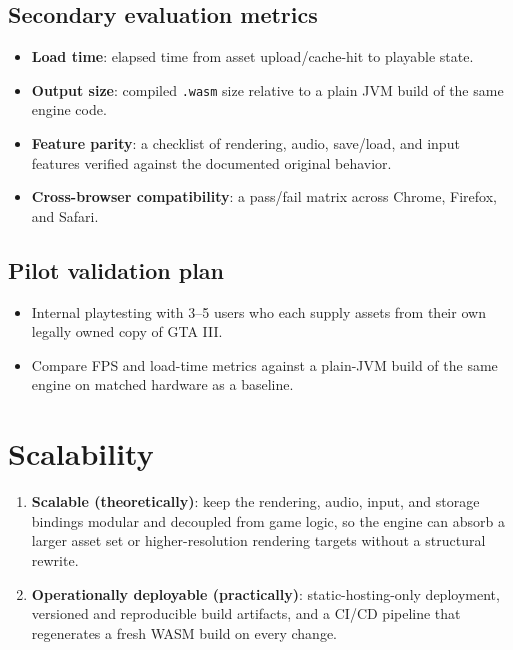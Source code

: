 \documentclass[11pt]{article}
\begin{document}
\subsection{Secondary evaluation metrics}
\begin{itemize}[itemsep=2pt]
  \item \textbf{Load time}: elapsed time from asset upload/cache-hit to playable state.
  \item \textbf{Output size}: compiled \texttt{.wasm} size relative to a plain JVM build of the same engine code.
  \item \textbf{Feature parity}: a checklist of rendering, audio, save/load, and input features verified against the documented original behavior.
  \item \textbf{Cross-browser compatibility}: a pass/fail matrix across Chrome, Firefox, and Safari.
\end{itemize}

\subsection{Pilot validation plan}
\begin{itemize}[itemsep=2pt]
  \item Internal playtesting with 3--5 users who each supply assets from their own legally owned copy of GTA III.
  \item Compare FPS and load-time metrics against a plain-JVM build of the same engine on matched hardware as a baseline.
\end{itemize}

\section{Scalability}
\begin{enumerate}[itemsep=2pt]
  \item \textbf{Scalable (theoretically)}: keep the rendering, audio, input, and storage bindings modular and decoupled from game logic, so the engine can absorb a larger asset set or higher-resolution rendering targets without a structural rewrite.
  \item \textbf{Operationally deployable (practically)}: static-hosting-only deployment, versioned and reproducible build artifacts, and a CI/CD pipeline that regenerates a fresh WASM build on every change.
\end{enumerate}
\end{document}
